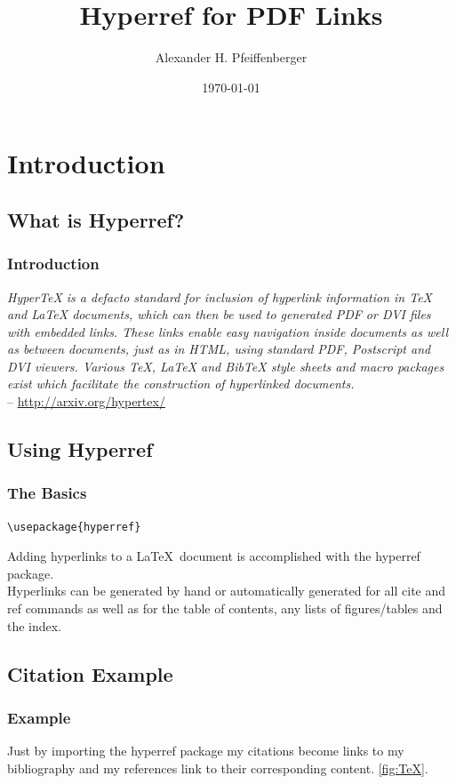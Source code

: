 \documentclass[10pt]{beamer}
\title{Hyperref for PDF Links}
\author{Alexander H. Pfeiffenberger}
\institute{Electrical and Computer Engineering \\Auburn University}
\date{\scriptsize{\today}}
\begin{document}
\maketitle


\section{Introduction}
\subsection{What is Hyperref?}
\begin{frame}[fragile]
\frametitle{Introduction}
\textit{HyperTeX is a defacto standard for inclusion of hyperlink information in TeX and LaTeX documents, which can then be used to generated PDF or DVI files with embedded links. These links enable easy navigation inside documents as well as between documents, just as in HTML, using standard PDF, Postscript and DVI viewers. Various TeX, LaTeX and BibTeX style sheets and macro packages exist which facilitate the construction of hyperlinked documents.}
\\ -- \url{http://arxiv.org/hypertex/}
\end{frame}

\subsection{Using Hyperref}
\begin{frame}[fragile]
\frametitle{The Basics}
\begin{verbatim}\usepackage{hyperref}
\end{verbatim}
Adding hyperlinks to a \LaTeX\ document is accomplished with the hyperref package.
\\[10pt]
Hyperlinks can be generated by hand or automatically generated for all cite and ref commands as well as for the table of contents, any lists of figures/tables and the index.
\end{frame}

\subsection{Citation Example}
\begin{frame}[fragile]
\frametitle{Example}
Just by importing the hyperref package my citations \cite{hyperrefReadme} become links to my bibliography \cite{HyperTextMarks} and my references link to their corresponding content. \ref{fig:TeX}.
\end{frame}
\end{document}
